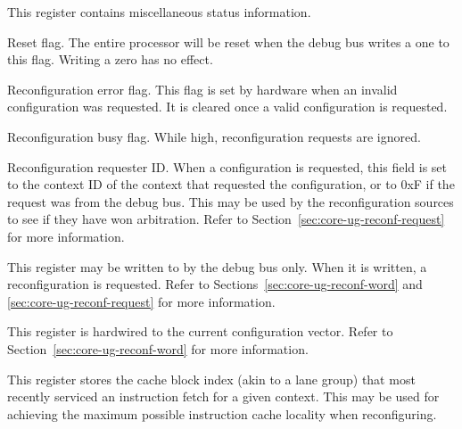 This register contains miscellaneous status information.

\debugCanWrite{}
Reset flag. The entire \rvex{} processor will be reset when the debug bus writes
a one to this flag. Writing a zero has no effect.

Reconfiguration error flag. This flag is set by hardware when an invalid
configuration was requested. It is cleared once a valid configuration is
requested.

Reconfiguration busy flag. While high, reconfiguration requests are ignored.

Reconfiguration requester ID. When a configuration is requested, this field is
set to the context ID of the context that requested the configuration, or to
0xF if the request was from the debug bus. This may be used by the
reconfiguration sources to see if they have won arbitration. Refer to
Section~\ref{sec:core-ug-reconf-request} for more information.


This register may be written to by the debug bus only. When it is written, a
reconfiguration is requested. Refer to Sections~\ref{sec:core-ug-reconf-word}
and \ref{sec:core-ug-reconf-request} for more information.

\debugCanWrite{}


This register is hardwired to the current configuration vector. Refer to
Section~\ref{sec:core-ug-reconf-word} for more information.



This register stores the cache block index (akin to a lane group) that most
recently serviced an instruction fetch for a given context. This may be used for
achieving the maximum possible instruction cache locality when reconfiguring.

